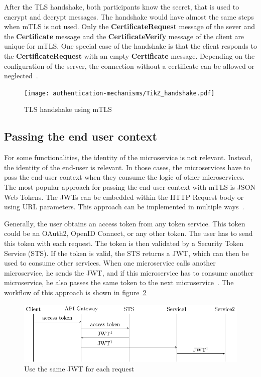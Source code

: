 After the TLS handshake, both participants know the secret, that is used to encrypt and decrypt messages.
The handshake would have almost the same steps when mTLS is not used.
Only the \textbf{CertificateRequest} message of the sever and the \textbf{Certificate} message and the \textbf{CertificateVerify} message of the client are unique for mTLS.
One special case of the handshake is that the client responds to the \textbf{CertificateRequest} with an empty \textbf{Certificate} message.
Depending on the configuration of the server, the connection without a certificate can be allowed or neglected~\cite{parsovs2013practical}.

\begin{figure}
	\centering
	\texttt{[image: authentication-mechanisms/TikZ\_handshake.pdf]}
	\caption{TLS handshake using mTLS~\cite{parsovs2013practical}}
	\label{fig:tlshandshake}
\end{figure}

\subsection{Passing the end user context} \label{sec:mtls_end_user_context}
For some functionalities, the identity of the microservice is not relevant. Instead, the identity of the end-user is relevant.
In those cases, the microservices have to pass the end-user context when they consume the logic of other microservices.
The most popular approach for passing the end-user context with mTLS is JSON Web Tokens.
The JWTs can be embedded within the HTTP Request body or using URL parameters.
This approach can be implemented in multiple ways~\cite{dias2020microservices}.

Generally, the user obtains an access token from any token service.
This token could be an OAuth2, OpenID Connect, or any other token.
The user has to send this token with each request.
The token is then validated by a Security Token Service (STS).
If the token is valid, the STS returns a JWT, which can then be used to consume other services.
When one microservice calls another microservice, he sends the JWT, and if this microservice has to consume another microservice, he also passes the same token to the next microservice~\cite{dias2020microservices}.
The workflow of this approach is shown in figure~\ref{fig:mtls_id_1}
\begin{figure}
	\centering
	\includegraphics{images/authentication-mechanisms/TikZ_jwt_identity_1.pdf}
	\caption{Use the same JWT for each request~\cite{dias2020microservices}}
	\label{fig:mtls_id_1}
\end{figure}

